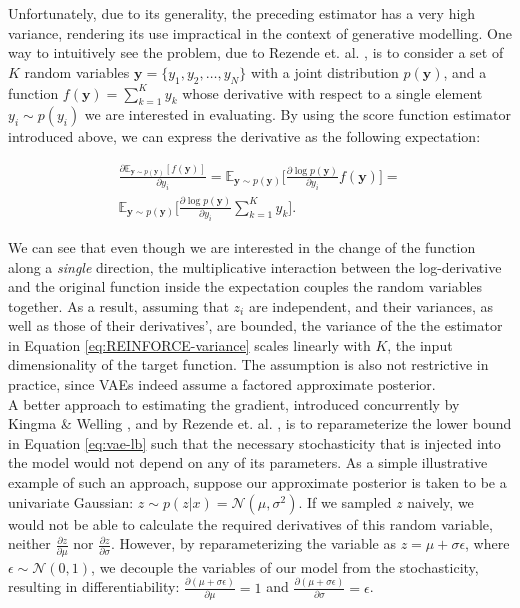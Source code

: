 \documentclass{report}
\begin{document}
\bigskip

\noindent Unfortunately, due to its generality, the preceding estimator has a very high variance, rendering its use impractical in the context of generative modelling. One way to intuitively see the problem, due to Rezende et. al. \cite{rezende14}, is to consider a set of $K$ random variables $\boldsymbol{y} = \{y_1, y_2, \dots, y_N\}$ with a joint distribution $p(\boldsymbol{y})$, and a function $f(\boldsymbol{y}) = \sum_{k=1}^K y_k$ whose derivative with respect to a single element $y_i \sim p(y_i)$ we are interested in evaluating. By using the score function estimator introduced above, we can express the derivative as the following expectation:

\begin{equation}
\begin{gathered}
\frac{\partial \mathbb{E}_{\boldsymbol{y} \sim p(\boldsymbol{y})} [f(\boldsymbol{y})]}{\partial y_i} = \mathbb{E}_{\boldsymbol{y} \sim p(\boldsymbol{y})} \Big[ \frac{\partial \log p(\boldsymbol{y})}{\partial y_i} f(\boldsymbol{y}) \Big] = \\ 
\mathbb{E}_{\boldsymbol{y} \sim p(\boldsymbol{y})} \Big[ \frac{\partial \log p(\boldsymbol{y})}{\partial y_i} \sum_{k=1}^K y_k \Big].
\end{gathered}
\label{eq:REINFORCE-variance}
\end{equation}

\bigskip

\noindent We can see that even though we are interested in the change of the function along a \textit{single} direction, the multiplicative interaction between the log-derivative and the original function inside the expectation couples the random variables together. As a result, assuming that $z_i$ are independent, and their variances, as well as those of their derivatives', are bounded, the variance of the the estimator in Equation \ref{eq:REINFORCE-variance} scales linearly with $K$, the input dimensionality of the target function. The assumption is also not restrictive in practice, since VAEs indeed assume a factored approximate posterior. \\

\noindent A better approach to estimating the gradient, introduced concurrently by Kingma \& Welling \cite{vae}, and by Rezende et. al. \cite{rezende14}, is to reparameterize the lower bound in Equation \ref{eq:vae-lb} such that the necessary stochasticity that is injected into the model would not depend on any of its parameters. As a simple illustrative example of such an approach, suppose our approximate posterior is taken to be a univariate Gaussian: $z \sim p(z|x) = \mathcal{N}(\mu, \sigma^2)$. If we sampled $z$ naively, we would not be able to calculate the required derivatives of this random variable, neither $\frac{\partial z}{\partial \mu}$ nor $\frac{\partial z}{\partial \sigma}$. However, by reparameterizing the variable as $z = \mu + \sigma \epsilon$, where $\epsilon \sim \mathcal{N}(0, 1)$, we decouple the variables of our model from the stochasticity, resulting in differentiability: $\frac{\partial (\mu + \sigma \epsilon)}{\partial \mu} = 1$ and $\frac{\partial (\mu + \sigma \epsilon)}{\partial \sigma} = \epsilon$. \\
\end{document}
